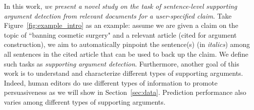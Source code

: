 In this work, \textit{we present a novel study on the task of sentence-level supporting argument detection from relevant documents for a user-specified claim}. Take Figure~\ref{fig:example_intro} as an example: assume we are given a claim on the topic of ``banning cosmetic surgery" and a relevant article (cited for argument construction), we aim to automatically pinpoint the sentence(s) (in \textit{italics}) among all sentences in the cited article that can be used to back up the claim. We define such tasks as \textit{supporting argument detection}. 
%
Furthermore, another goal of this work is to understand and characterize different types of supporting arguments. Indeed, human editors do use different types of information to promote persuasiveness as we will show in Section~\ref{sec:data}. Prediction performance also varies among different types of supporting arguments. 


